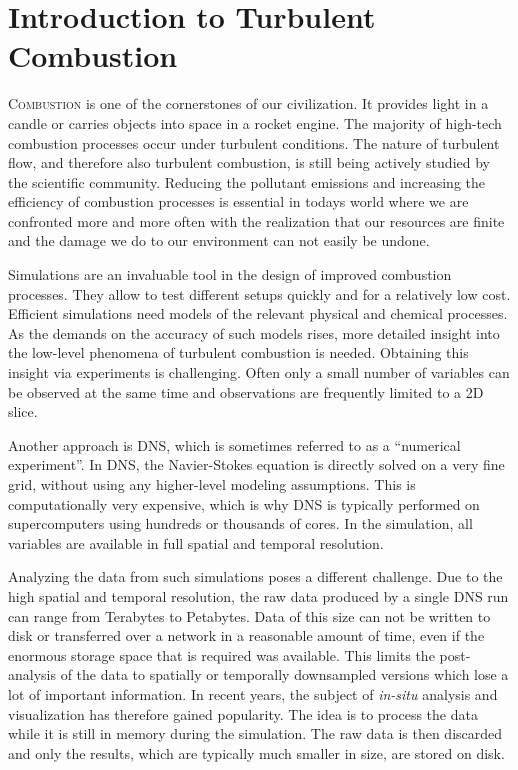 \chapter{Introduction to Turbulent Combustion} %
\label{cha:turbulent_combustion}
%
\lettrine[lines=3, lhang=0.05]{C}{ombustion} is one of the cornerstones of our
civilization.
%
It provides light in a candle or carries objects into space in a rocket engine.
%
The majority of high-tech combustion processes occur under turbulent conditions.
%
The nature of turbulent flow, and therefore also turbulent combustion, is still
being actively studied by the scientific community.
%
Reducing the pollutant emissions and increasing the efficiency of combustion
processes is essential in todays world where we are confronted more and more
often with the realization that our resources are finite and the damage we do to
our environment can not easily be undone.
%

%
Simulations are an invaluable tool in the design of improved combustion
processes.
%
They allow to test different setups quickly and for a relatively low cost.
%
Efficient simulations need models of the relevant physical and chemical
processes.
%
As the demands on the accuracy of such models rises, more detailed insight into
the low-level phenomena of turbulent combustion is needed.
%
Obtaining this insight via experiments is challenging.
%
Often only a small number of variables can be observed at the same time and
observations are frequently limited to a \ac{2D} slice.
%

%
Another approach is \acf{DNS}, which is sometimes referred to as a ``numerical
experiment''.
%
In \ac{DNS}, the Navier-Stokes equation is directly solved on a very fine grid,
without using any higher-level modeling assumptions.
%
This is computationally very expensive, which is why \ac{DNS} is typically
performed on supercomputers using hundreds or thousands of cores.
%
In the simulation, all variables are available in full spatial and temporal
resolution.
%

%
Analyzing the data from such simulations poses a different challenge.
%
Due to the high spatial and temporal resolution, the raw data produced by a
single \ac{DNS} run can range from Terabytes to Petabytes.
%
Data of this size can not be written to disk or transferred over a network in a
reasonable amount of time, even if the enormous storage space that is required
was available.
%
This limits the post-analysis of the data to spatially or temporally downsampled
versions which lose a lot of important information.
%
In recent years, the subject of \emph{in-situ} analysis and visualization has
therefore gained popularity.
%
The idea is to process the data while it is still in memory during the
simulation.
%
The raw data is then discarded and only the results, which are typically much
smaller in size, are stored on disk.
%

